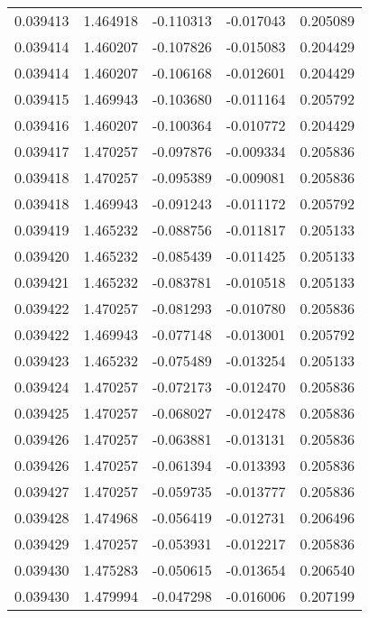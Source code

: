 \begin{tabular}{lrrrr}
0.039413    &  1.464918 & -0.110313 & -0.017043 &             0.205089 \\
0.039414    &  1.460207 & -0.107826 & -0.015083 &             0.204429 \\
0.039414    &  1.460207 & -0.106168 & -0.012601 &             0.204429 \\
0.039415    &  1.469943 & -0.103680 & -0.011164 &             0.205792 \\
0.039416    &  1.460207 & -0.100364 & -0.010772 &             0.204429 \\
0.039417    &  1.470257 & -0.097876 & -0.009334 &             0.205836 \\
0.039418    &  1.470257 & -0.095389 & -0.009081 &             0.205836 \\
0.039418    &  1.469943 & -0.091243 & -0.011172 &             0.205792 \\
0.039419    &  1.465232 & -0.088756 & -0.011817 &             0.205133 \\
0.039420    &  1.465232 & -0.085439 & -0.011425 &             0.205133 \\
0.039421    &  1.465232 & -0.083781 & -0.010518 &             0.205133 \\
0.039422    &  1.470257 & -0.081293 & -0.010780 &             0.205836 \\
0.039422    &  1.469943 & -0.077148 & -0.013001 &             0.205792 \\
0.039423    &  1.465232 & -0.075489 & -0.013254 &             0.205133 \\
0.039424    &  1.470257 & -0.072173 & -0.012470 &             0.205836 \\
0.039425    &  1.470257 & -0.068027 & -0.012478 &             0.205836 \\
0.039426    &  1.470257 & -0.063881 & -0.013131 &             0.205836 \\
0.039426    &  1.470257 & -0.061394 & -0.013393 &             0.205836 \\
0.039427    &  1.470257 & -0.059735 & -0.013777 &             0.205836 \\
0.039428    &  1.474968 & -0.056419 & -0.012731 &             0.206496 \\
0.039429    &  1.470257 & -0.053931 & -0.012217 &             0.205836 \\
0.039430    &  1.475283 & -0.050615 & -0.013654 &             0.206540 \\
0.039430    &  1.479994 & -0.047298 & -0.016006 &             0.207199 \\

\end{tabular}
